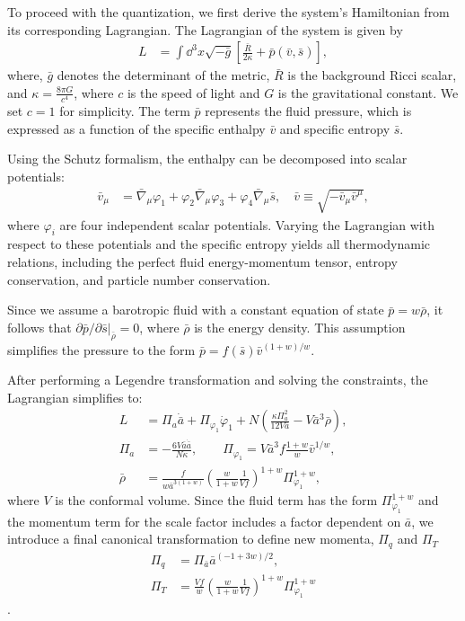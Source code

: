 \documentclass[a4paper,11pt]{article}
\begin{document}
To proceed with the quantization, we first derive the system's Hamiltonian from its
corresponding Lagrangian. The Lagrangian of the system is given by
\begin{align}\label{lagrangian}
	L & = \int \dd^3x \sqrt{-\bar{g}} \left[\frac{\bar{R}}{2\kappa}
		+ \bar{p}(\bar{v}, \bar{s})\right],
\end{align}
where, $\bar{g}$ denotes the determinant of the metric, $\bar{R}$ is the background
Ricci scalar, and $\kappa = \frac{8 \pi G}{c^4}$, where $c$ is the speed of light and
$G$ is the gravitational constant. We set $c = 1$ for simplicity. The term $\bar{p}$
represents the fluid pressure, which is expressed as a function of the specific enthalpy
$\bar{v}$ and specific entropy $\bar{s}$.

Using the Schutz formalism, the enthalpy can be decomposed into scalar potentials:
\begin{align}
	\bar{v}_\mu & = \bar\nabla_\mu \varphi_1
	+ \varphi_2 \bar\nabla_\mu \varphi_3
	+ \varphi_4 \bar\nabla_\mu \bar{s},
	\quad \bar{v} \equiv \sqrt{-\bar{v}_\mu \bar{v}^\mu},
\end{align}
where $\varphi_i$ are four independent scalar potentials. Varying the Lagrangian with
respect to these potentials and the specific entropy yields all thermodynamic relations,
including the perfect fluid energy-momentum tensor, entropy conservation, and particle
number conservation.

Since we assume a barotropic fluid with a constant equation of state $\bar{p} = w
	\bar{\rho}$, it follows that $\partial \bar{p} / \partial \bar{s} \vert_{\bar{\rho}}
	= 0$, where $\bar{\rho}$ is the energy density. This assumption simplifies the
pressure to the form $\bar{p} = f(\bar{s}) \bar{v}^{(1+w)/w}$.

After performing a Legendre transformation and solving the constraints, the Lagrangian
simplifies to:
\begin{align}
	L          & = \Pi_a \dot{\bar{a}} + \Pi_{\varphi_1} \dot{\varphi}_1 +
	N \left( \frac{\kappa \Pi_a^2}{12 V \bar{a}} - V \bar{a}^3 \bar{\rho} \right), \\
	\Pi_a      & = -\frac{6 V \bar{a} \dot{\bar{a}}}{N \kappa}, \qquad
	\Pi_{\varphi_1} = V \bar{a}^3 f \frac{1+w}{w}\bar{v}^{1/w},                    \\
	\bar{\rho} & = \frac{f}{w\bar{a}^{3(1+w)}} \left( \frac{w}{1+w}
	\frac{1}{Vf} \right)^{1+w}\Pi_{\varphi_1}^{1+w},
\end{align}
where $V$ is the conformal volume. Since the fluid term has the form
$\Pi_{\varphi_1}^{1+w}$ and the momentum term for the scale factor includes a factor
dependent on $\bar{a}$, we introduce a final canonical transformation to define new
momenta, $\Pi_q$ and $\Pi_T$
\begin{align}
	\Pi_q & = \Pi_{\bar{a}} \bar{a}^{(-1+3w)/2},                                                 \\
	\Pi_T & = \frac{V f}{w} \left( \frac{w}{1+w} \frac{1}{Vf}\right)^{1+w} \Pi_{\varphi_1}^{1+w}
\end{align}.
\end{document}
